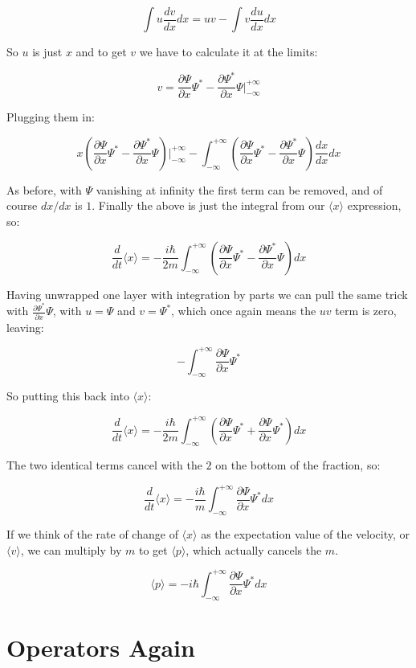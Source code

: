 $$
\int
u
\frac{dv}{dx}
dx = uv -
\int
v
\frac{du}{dx}
dx
$$

So $u$ is just $x$ and to get $v$ we have to calculate it at the limits:

$$
v =
\frac{\partial \Psi}{\partial x}\Psi^*
- \frac{\partial \Psi^*}{\partial x}\Psi
\bigg\rvert_{-\infty}^{+\infty}
$$

Plugging them in:

$$
x
\left(
\frac{\partial \Psi}{\partial x}\Psi^*
- \frac{\partial \Psi^*}{\partial x}\Psi
\right)
\bigg\rvert_{-\infty}^{+\infty}
-
\int_{-\infty}^{+\infty}
\left(
\frac{\partial \Psi}{\partial x}\Psi^*
- \frac{\partial \Psi^*}{\partial x}\Psi
\right)
\frac{dx}{dx}
dx
$$

As before, with $\Psi$ vanishing at infinity the first term can be removed, and of course $dx/dx$ is $1$. Finally the above is just the integral from our $\langle x \rangle$ expression, so:

$$
\frac{d}{dt} \langle x \rangle = -
\frac{i \hbar}{2m}
\int_{-\infty}^{+\infty}
\left(
\frac{\partial \Psi}{\partial x}\Psi^*
- \frac{\partial \Psi^*}{\partial x}\Psi
\right)
dx
$$

Having unwrapped one layer with integration by parts we can pull the same trick with $\frac{\partial \Psi^*}{\partial x}\Psi$, with $u = \Psi$ and $v = \Psi^*$, which once again means the $uv$ term is zero, leaving:

$$
-
\int_{-\infty}^{+\infty}
\frac{\partial \Psi}{\partial x}
\Psi^*
$$

So putting this back into $\langle x \rangle$:

$$
\frac{d}{dt} \langle x \rangle = -
\frac{i \hbar}{2m}
\int_{-\infty}^{+\infty}
\left(
\frac{\partial \Psi}{\partial x}\Psi^*
+ \frac{\partial \Psi}{\partial x}\Psi^*
\right)
dx
$$

The two identical terms cancel with the $2$ on the bottom of the fraction, so:

$$
\frac{d}{dt} \langle x \rangle = -
\frac{i \hbar}{m}
\int_{-\infty}^{+\infty}
\frac{\partial \Psi}{\partial x}\Psi^*
dx
$$

If we think of the rate of change of $\langle x \rangle$ as the expectation value of the velocity, or $\langle v \rangle$, we can multiply by $m$ to get $\langle p \rangle$, which actually cancels the $m$.

$$
\langle p \rangle = -
i \hbar
\int_{-\infty}^{+\infty}
\frac{\partial \Psi}{\partial x}\Psi^*
dx
$$

\section{Operators Again} \label{sec:qm-operators2}

